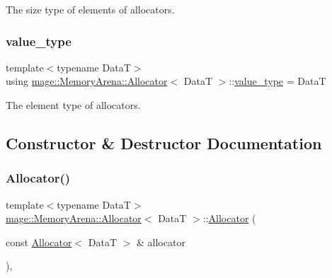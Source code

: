 The size type of elements of allocators. \hypertarget{structmage_1_1_memory_arena_1_1_allocator_a6ae3ef840bd738889b2c4136294a4f6d}{}\label{structmage_1_1_memory_arena_1_1_allocator_a6ae3ef840bd738889b2c4136294a4f6d} 
\subsubsection{\texorpdfstring{value\+\_\+type}{value\_type}}
{\footnotesize\ttfamily template$<$typename DataT$>$ \\
using \hyperlink{structmage_1_1_memory_arena_1_1_allocator}{mage\+::\+Memory\+Arena\+::\+Allocator}$<$ DataT $>$\+::\hyperlink{structmage_1_1_memory_arena_1_1_allocator_a6ae3ef840bd738889b2c4136294a4f6d}{value\+\_\+type} =  DataT}

The element type of allocators. 

\subsection{Constructor \& Destructor Documentation}
\hypertarget{structmage_1_1_memory_arena_1_1_allocator_a1cdd684969c4fdca577f86e1411db76d}{}\label{structmage_1_1_memory_arena_1_1_allocator_a1cdd684969c4fdca577f86e1411db76d} 
\subsubsection{\texorpdfstring{Allocator()}{Allocator()}\hspace{0.1cm}{\footnotesize\ttfamily [1/4]}}
{\footnotesize\ttfamily template$<$typename DataT$>$ \\
\hyperlink{structmage_1_1_memory_arena_1_1_allocator}{mage\+::\+Memory\+Arena\+::\+Allocator}$<$ DataT $>$\+::\hyperlink{structmage_1_1_memory_arena_1_1_allocator}{Allocator} (\begin{DoxyParamCaption}\item[{const \hyperlink{structmage_1_1_memory_arena_1_1_allocator}{Allocator}$<$ DataT $>$ \&}]{allocator }\end{DoxyParamCaption})\hspace{0.3cm}{\ttfamily [default]}, {\ttfamily [noexcept]}}

